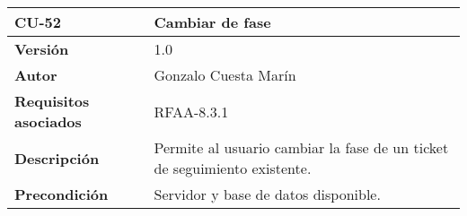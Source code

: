 \begin{longtable}[]{@{}ll@{}}
\toprule
\begin{minipage}[b]{0.21\columnwidth}\raggedright
\textbf{CU-52}\strut
\end{minipage} & \begin{minipage}[b]{0.73\columnwidth}\raggedright
\textbf{Cambiar de fase}\strut
\end{minipage}\tabularnewline
\midrule
\endhead
\begin{minipage}[t]{0.21\columnwidth}\raggedright
\textbf{Versión}\strut
\end{minipage} & \begin{minipage}[t]{0.73\columnwidth}\raggedright
1.0\strut
\end{minipage}\tabularnewline
\begin{minipage}[t]{0.21\columnwidth}\raggedright
\textbf{Autor}\strut
\end{minipage} & \begin{minipage}[t]{0.73\columnwidth}\raggedright
Gonzalo Cuesta Marín\strut
\end{minipage}\tabularnewline
\begin{minipage}[t]{0.21\columnwidth}\raggedright
\textbf{Requisitos asociados}\strut
\end{minipage} & \begin{minipage}[t]{0.73\columnwidth}\raggedright
RFAA-8.3.1\strut
\end{minipage}\tabularnewline
\begin{minipage}[t]{0.21\columnwidth}\raggedright
\textbf{Descripción}\strut
\end{minipage} & \begin{minipage}[t]{0.73\columnwidth}\raggedright
Permite al usuario cambiar la fase de un ticket de seguimiento
existente.\strut
\end{minipage}\tabularnewline
\begin{minipage}[t]{0.21\columnwidth}\raggedright
\textbf{Precondición}\strut
\end{minipage} & \begin{minipage}[t]{0.73\columnwidth}\raggedright
Servidor y base de datos disponible.


\end{minipage}
\end{longtable}
